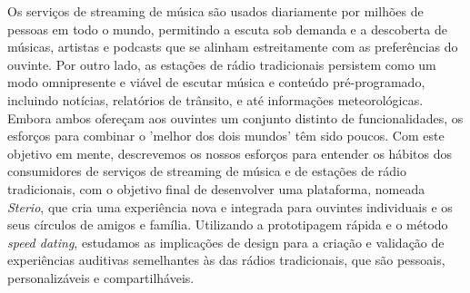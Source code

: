 \noindent Os serviços de streaming de música são usados ​​diariamente por milhões de pessoas em todo o mundo, permitindo a escuta sob demanda e a descoberta de músicas, artistas e podcasts que se alinham estreitamente com as preferências do ouvinte. Por outro lado, as estações de rádio tradicionais persistem como um modo omnipresente e viável de escutar música e conteúdo pré-programado, incluindo notícias, relatórios de trânsito, e até informações meteorológicas. Embora ambos ofereçam aos ouvintes um conjunto distinto de funcionalidades, os esforços para combinar o 'melhor dos dois mundos' têm sido poucos. Com este objetivo em mente, descrevemos os nossos esforços para entender os hábitos dos consumidores de serviços de streaming de música e de estações de rádio tradicionais, com o objetivo final de desenvolver uma plataforma, nomeada \textit{Sterio}, que cria uma experiência nova e integrada para ouvintes individuais e os seus círculos de amigos e família. Utilizando a prototipagem rápida e o método \textit{speed dating}, estudamos as implicações de design para a criação e validação de experiências auditivas semelhantes às das rádios tradicionais, que são pessoais, personalizáveis ​​e compartilháveis.